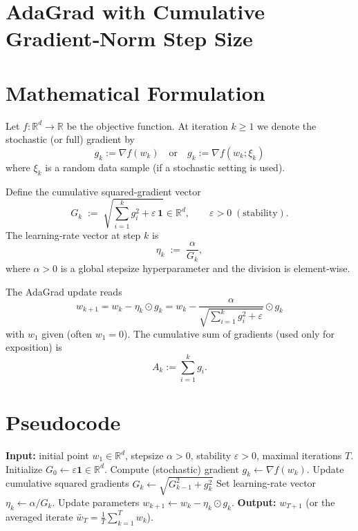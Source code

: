 \documentclass{article}
\newcommand{\R}{\mathbb{R}}
\begin{document}
\section*{AdaGrad with Cumulative Gradient‑Norm Step Size}

\section*{Mathematical Formulation}
Let $f:\R^{d}\rightarrow\R$ be the objective function.  
At iteration $k\ge 1$ we denote the stochastic (or full) gradient by 
\[
g_k:=\nabla f(w_k)\quad\text{or}\quad g_k:=\nabla f(w_k;\xi_k)
\]
where $\xi_k$ is a random data sample (if a stochastic setting is used).

Define the cumulative squared‑gradient vector
\[
G_k \;:=\;\sqrt{\sum_{i=1}^{k} g_i^{2}+\varepsilon\,\mathbf{1}}\in\R^{d},
\qquad\varepsilon>0\;(\text{stability}).
\]
The learning‑rate vector at step $k$ is
\[
\eta_k \;:=\; \frac{\alpha}{G_k},
\]
where $\alpha>0$ is a global stepsize hyperparameter and the division is element‑wise.

The AdaGrad update reads
\[
\boxed{\,w_{k+1}= w_k - \eta_k \odot g_k
      = w_k - \frac{\alpha}{\sqrt{\sum_{i=1}^{k} g_i^{2}+\varepsilon}} \odot g_k \, }    \tag{1}
\]
with $w_1$ given (often $w_1=0$).  
The cumulative sum of gradients (used only for exposition) is
\[
A_k := \sum_{i=1}^{k} g_i . \tag{2}
\]

\section*{Pseudocode}
\begin{algorithm}[H]
\caption{AdaGrad with Cumulative Gradient‑Norm Step Size}
\begin{algorithmic}[1]
\STATE \textbf{Input:} initial point $w_1\in\R^{d}$, stepsize $\alpha>0$, stability $\varepsilon>0$, maximal iterations $T$.
\STATE Initialize $G_0\gets \varepsilon\mathbf{1}\in\R^{d}$.
    \STATE Compute (stochastic) gradient $g_k \gets \nabla f(w_k)$.
    \STATE Update cumulative squared gradients $G_k \gets \sqrt{G_{k-1}^{2}+g_k^{2}}$   \hfill{}
    \STATE Set learning‑rate vector $\eta_k \gets \alpha / G_k$.
    \STATE Update parameters $w_{k+1} \gets w_k - \eta_k \odot g_k$.
\ENDFOR
\STATE \textbf{Output:} $w_{T+1}$ (or the averaged iterate $\bar w_T = \frac1T\sum_{k=1}^{T} w_k$).
\end{algorithmic}
\end{algorithm}
\end{document}
